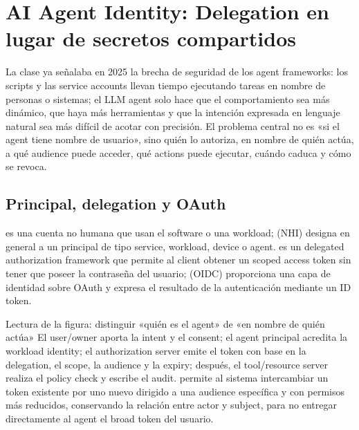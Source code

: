 \section{AI Agent Identity: Delegation en lugar de secretos compartidos}

La clase ya señalaba en 2025 la brecha de seguridad de los agent frameworks: los scripts y las service accounts llevan tiempo ejecutando tareas en nombre de personas o sistemas; el LLM agent solo hace que el comportamiento sea más dinámico, que haya más herramientas y que la intención expresada en lenguaje natural sea más difícil de acotar con precisión. El problema central no es «si el agent tiene nombre de usuario», sino quién lo autoriza, en nombre de quién actúa, a qué audience puede acceder, qué actions puede ejecutar, cuándo caduca y cómo se revoca.

\subsection{Principal, delegation y OAuth}

 es una cuenta no humana que usan el software o una workload;  (NHI) designa en general a un principal de tipo service, workload, device o agent.  es un delegated authorization framework que permite al client obtener un scoped access token sin tener que poseer la contraseña del usuario;  (OIDC) proporciona una capa de identidad sobre OAuth y expresa el resultado de la autenticación mediante un ID token.


\begin{knowledgebox}{Lectura de la figura: distinguir «quién es el agent» de «en nombre de quién actúa»}
El user/owner aporta la intent y el consent; el agent principal acredita la workload identity; el authorization server emite el token con base en la delegation, el scope, la audience y la expiry; después, el tool/resource server realiza el policy check y escribe el audit.  permite al sistema intercambiar un token existente por uno nuevo dirigido a una audience específica y con permisos más reducidos, conservando la relación entre actor y subject, para no entregar directamente al agent el broad token del usuario.
\end{knowledgebox}

